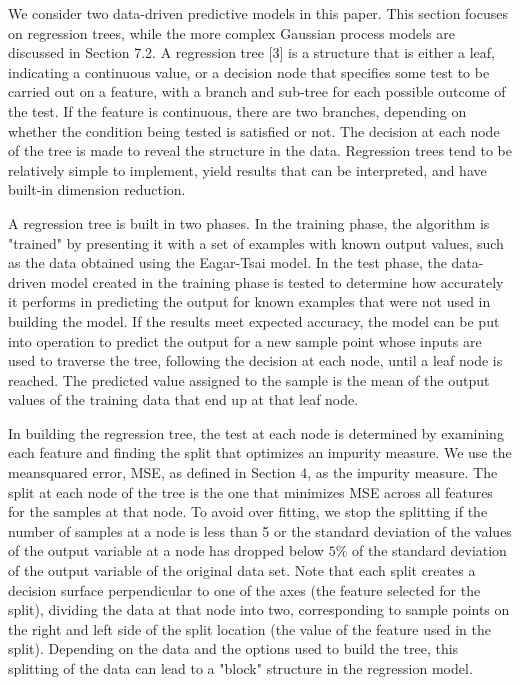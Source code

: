 \documentclass[10pt]{article}
\begin{document}
We consider two data-driven predictive models in this paper. This section focuses on regression trees, while the more complex Gaussian process models are discussed in Section 7.2. A regression tree [3] is a structure that is either a leaf, indicating a continuous value, or a decision node that specifies some test to be carried out on a feature, with a branch and sub-tree for each possible outcome of the test. If the feature is continuous, there are two branches, depending on whether the condition being tested is satisfied or not. The decision at each node of the tree is made to reveal the structure in the data. Regression trees tend to be relatively simple to implement, yield results that can be interpreted, and have built-in dimension reduction.

A regression tree is built in two phases. In the training phase, the algorithm is "trained" by presenting it with a set of examples with known output values, such as the data obtained using the Eagar-Tsai model. In the test phase, the data-driven model created in the training phase is tested to determine how accurately it performs in predicting the output for known examples that were not used in building the model. If the results meet expected accuracy, the model can be put into operation to predict the output for a new sample point whose inputs are used to traverse the tree, following the decision at each node, until a leaf node is reached. The predicted value assigned to the sample is the mean of the output values of the training data that end up at that leaf node.

In building the regression tree, the test at each node is determined by examining each feature and finding the split that optimizes an impurity measure. We use the meansquared error, MSE, as defined in Section 4, as the impurity measure. The split at each node of the tree is the one that minimizes MSE across all features for the samples at that node. To avoid over fitting, we stop the splitting if the number of samples at a node is less than 5 or the standard deviation of the values of the output variable at a node has dropped below $5 \%$ of the standard deviation of the output variable of the original data set. Note that each split creates a decision surface perpendicular to one of the axes (the feature selected for the split), dividing the data at that node into two, corresponding to sample points on the right and left side of the split location (the value of the feature used in the split). Depending on the data and the options used to build the tree, this splitting of the data can lead to a "block" structure in the regression model.
\end{document}
